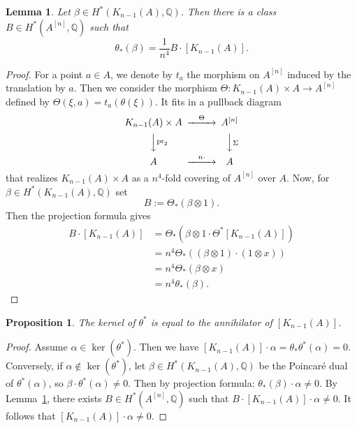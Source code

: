 \documentclass{alggeom}
\DeclareMathOperator{\pr}{pr}
\newcommand{\hilb}[1]{^{[#1]}}
\newcommand{\kum}[2]{K_{ #2 }( #1 )}
\newcommand{\Q}{\mathbb{Q}}
\theoremstyle{plain}
\newtheorem{lemma}[theorem]{Lemma}
\newtheorem{proposition}[theorem]{Proposition}
\theoremstyle{definition}
\theoremstyle{remark}
\begin{document}
\begin{lemma}\label{petitlemmeenplus}
 Let $\beta\in H^*(K_{n-1}(A),\Q)$. Then there is a class $B\in H^{*}(A\hilb{n},\Q)$ such that 
 $$\theta_*(\beta)=\frac{1}{n^4}B\cdot [\kum{A}{n-1}].$$
\end{lemma}
\begin{proof}
For a point $a\in A$, we denote by $t_a$ the morphism on $A\hilb{n}$ induced by the translation by $a$.
Then we consider the morphism $\Theta :\kum{A}{n-1}\times A \longrightarrow A\hilb{n}$ defined by $\Theta(\xi,a)=t_a(\theta(\xi))$. It fits in a pullback diagram
\begin{equation}
\begin{CD}
\kum{A}{n-1}\times A @>\Theta >> A\hilb{n}\\
@VV\pr_2V @VV\Sigma V\\
A @> n\cdot >> A
\end{CD}
\end{equation}
that realizes $\kum{A}{n-1}\times A$ as a $n^4$-fold covering of $A\hilb{n}$ over $A$.
Now, for $\beta\in H^*(K_{n-1}(A),\Q)$ set
$$
B:=\Theta_*(\beta\otimes 1).
$$
Then the projection formula gives
\begin{align*}
B\cdot [K_{n-1}(A)]&= \Theta_*\left(\beta\otimes 1\cdot \Theta^*[\kum{A}{n-1}]\right) \\
&=n^4 \Theta_*\left((\beta\otimes 1)\cdot  (1\otimes x)\right)\\
&=n^4 \Theta_*(\beta \otimes x)\\
&=n^4\theta_*(\beta).
\end{align*}

\end{proof}

\begin{proposition}\label{annihilator}
The kernel of $\theta^*$ is equal to the annihilator of $[\kum{A}{n-1}]$.
\end{proposition}
\begin{proof}
Assume $\alpha\in \ker(\theta^*)$. Then we have
$
[\kum{A}{n-1}]\cdot \alpha = \theta_*\theta^*(\alpha) = 0
$. 
Conversely, if $\alpha\notin \ker(\theta^*)$,
let $\beta\in H^*(\kum{A}{n-1},\Q)$ be the Poincar\'e dual of $\theta^*(\alpha)$, so $\beta\cdot \theta^*(\alpha)\neq 0$.
Then by projection formula:
$
\theta_*(\beta)\cdot \alpha\neq 0.
$
By Lemma~\ref{petitlemmeenplus}, there exists $B\in H^*(A\hilb{n},\Q)$ such that 
$B\cdot [\kum{A}{n-1}]\cdot \alpha\neq 0$. It follows that $ [\kum{A}{n-1}]\cdot \alpha\neq 0$.
\end{proof}
\end{document}
